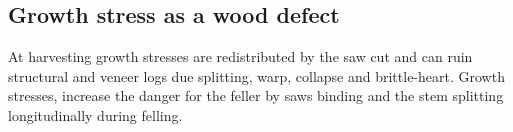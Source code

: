 \subsection{Growth stress as a wood defect}
\label{subsection:Growth stress as a wood defect}
At harvesting growth stresses are redistributed by the saw cut
and can ruin structural and veneer logs due splitting, 
warp, collapse and brittle-heart. Growth stresses, increase the
danger for the feller by saws binding and the stem splitting longitudinally during felling.